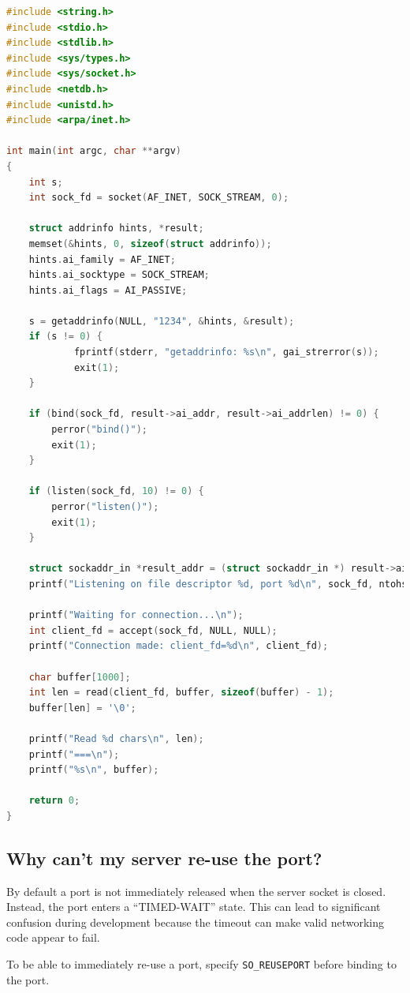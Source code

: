 \begin{lstlisting}[language=C]
#include <string.h>
#include <stdio.h>
#include <stdlib.h>
#include <sys/types.h>
#include <sys/socket.h>
#include <netdb.h>
#include <unistd.h>
#include <arpa/inet.h>

int main(int argc, char **argv)
{
    int s;
    int sock_fd = socket(AF_INET, SOCK_STREAM, 0);

    struct addrinfo hints, *result;
    memset(&hints, 0, sizeof(struct addrinfo));
    hints.ai_family = AF_INET;
    hints.ai_socktype = SOCK_STREAM;
    hints.ai_flags = AI_PASSIVE;

    s = getaddrinfo(NULL, "1234", &hints, &result);
    if (s != 0) {
            fprintf(stderr, "getaddrinfo: %s\n", gai_strerror(s));
            exit(1);
    }

    if (bind(sock_fd, result->ai_addr, result->ai_addrlen) != 0) {
        perror("bind()");
        exit(1);
    }

    if (listen(sock_fd, 10) != 0) {
        perror("listen()");
        exit(1);
    }
    
    struct sockaddr_in *result_addr = (struct sockaddr_in *) result->ai_addr;
    printf("Listening on file descriptor %d, port %d\n", sock_fd, ntohs(result_addr->sin_port));

    printf("Waiting for connection...\n");
    int client_fd = accept(sock_fd, NULL, NULL);
    printf("Connection made: client_fd=%d\n", client_fd);

    char buffer[1000];
    int len = read(client_fd, buffer, sizeof(buffer) - 1);
    buffer[len] = '\0';

    printf("Read %d chars\n", len);
    printf("===\n");
    printf("%s\n", buffer);

    return 0;
}
\end{lstlisting}

\subsection{Why can't my server re-use the port?}\label{why-cant-my-server-re-use-the-port}

By default a port is not immediately released when the server socket is closed. Instead, the port enters a ``TIMED-WAIT'' state. This can lead to significant confusion during development because the timeout can make valid networking code appear to fail.

To be able to immediately re-use a port, specify \texttt{SO\_REUSEPORT} before binding to the port.

